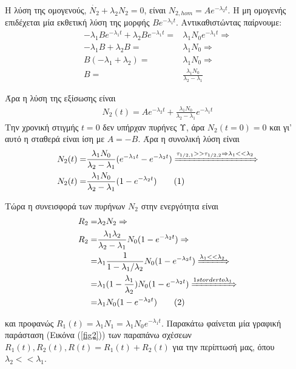 \documentclass[a4paper]{article}
\newcommand\numberthis{\addtocounter{equation}{1}\tag{\theequation}}
\begin{document}
	Η λύση της ομογενούς, $\dot{N_2} + \lambda_2N_2=0$, είναι $N_{2,hom} = A e^{-\lambda_2t}$. Η μη ομογενής επιδέχεται μία εκθετική λύση της μορφής $Be^{-\lambda_1t}$. Αντικαθιστώντας παίρνουμε: 
	\begin{align*}		
		-\lambda_1 B e^{-\lambda_1t} +\lambda_2 B e^{-\lambda_1 t} =& \lambda_1N_{0}e^{-\lambda_1t}\Rightarrow\\
		-\lambda_1B+\lambda_2B =& \lambda_1N_{0} \Rightarrow\\ 
		B(-\lambda_1+\lambda_2) = & \lambda_1N_{0} \Rightarrow\\ 
		B =&\frac{\lambda_1N_{0}}{\lambda_2-\lambda_1}
	\end{align*}

Άρα η λύση της εξίσωσης είναι 
	\begin{align*}
		N_2(t) = Ae^{-\lambda_2t} + \frac{\lambda_1 N_0}{\lambda_2-\lambda_1}e^{-\lambda_1t} 
	\end{align*}
	Την χρονική στιγμής $t=0$ δεν υπήρχαν πυρήνες Υ, άρα $N_2(t=0) =0$ και γι' αυτό η σταθερά είναι ίση με $A = -B$. Άρα η συνολική λύση είναι 
	\begin{align*}
		N_2(t) =& \frac{\lambda_1 N_0}{\lambda_2-\lambda_1} (e^{-\lambda_1t} - e^{-\lambda_2t}) \xRightarrow{\tau_{1/2, 1}>>\tau_{1/2, 2}\Rightarrow \lambda_1<<\lambda_2} \\
		N_2(t) =& \frac{\lambda_1 N_0}{\lambda_2-\lambda_1} ( 1 - e^{-\lambda_2t})  \numberthis
	\end{align*}
	
	Τώρα η συνεισφορά των πυρήνων $N_2$ στην ενεργότητα είναι 
		\begin{align*}
			R_2 =& \lambda_2 N_2  \Rightarrow\\
		    R_2 =& \frac{\lambda_1\lambda_2}{\lambda_2-\lambda_1}N_0(1-e^{-\lambda_2t}) \Rightarrow\\
		    =& \lambda_1 \frac{1}{1-\lambda_1/\lambda_2}N_0 (1-e^{-\lambda_2t})\xRightarrow{\lambda_1<<\lambda_2} \\
		    =& \lambda_1(1-\frac{\lambda_1}{\lambda_2})N_0 (1-e^{-\lambda_2t})\xRightarrow{1st order to \lambda_1} \\ 
		    =& \lambda_1N_0(1-e^{-\lambda_2t})\numberthis 
	\end{align*}			
	
	και προφανώς $R_1(t) = \lambda_1 N_1=\lambda_1 N_0 e^{-\lambda_1t}$. 
	Παρακάτω φαίνεται μία γραφική παράσταση (Eικόνα (\ref{fig2}))  των παραπάνω σχέσεων $R_1(t), R_2(t), R(t)=R_1(t)+R_2(t)$ για την περίπτωσή μας, όπου $\lambda_2<<\lambda_1$.
	
\end{document}
